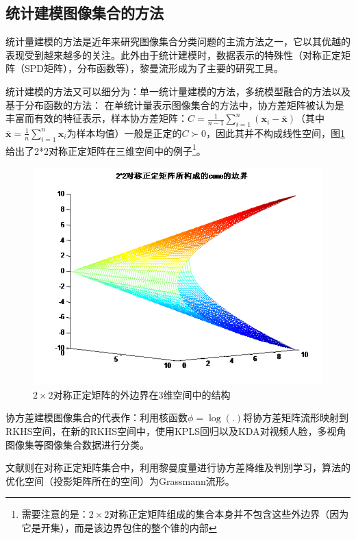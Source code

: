 \subsection{统计建模图像集合的方法}
\label{sec:current_Statistics}
统计量建模的方法是近年来研究图像集合分类问题的主流方法之一，它以其优越的表现受到越来越多的关注。此外由于统计建模时，数据表示的特殊性（对称正定矩阵（SPD矩阵），分布函数等），黎曼流形成为了主要的研究工具。

统计建模的方法又可以细分为：单一统计量建模的方法，多统模型融合的方法以及基于分布函数的方法：
在单统计量表示图像集合的方法中，协方差矩阵被认为是丰富而有效的特征表示，样本协方差矩阵：$C=\frac{1}{n-1}\sum_{i=1}^n (\bm{x}_i-\bar{\bm{x}})$（其中$\bar{\bm{x}}=\frac{1}{n}\sum_{i=1}^n \bm{x}_i$为样本均值）一般是正定的$C \succ 0$，因此其并不构成线性空间，图\ref{fig:2d_SPD_cone}给出了2*2对称正定矩阵在三维空间中的例子\footnote{需要注意的是：$2\times 2$对称正定矩阵组成的集合本身并不包含这些外边界（因为它是开集），而是该边界包住的整个锥的内部}。
\begin{figure}[h]
	\centering
	\includegraphics[width=0.5\linewidth]{source/2d_SPD_cone.png}
	\caption{$2\times 2$对称正定矩阵的外边界在3维空间中的结构}
	\label{fig:2d_SPD_cone}
\end{figure}

协方差建模图像集合的代表作\cite{Statistics_CDL}：利用核函数$\phi=\log(.)$将协方差矩阵流形映射到RKHS空间，在新的RKHS空间中，使用KPLS\cite{Kernel_KPLS}回归以及KDA\cite{Kernel_KDA}对视频人脸，多视角图像集等图像集合数据进行分类。

文献\cite{Statistics_SPDML}则在对称正定矩阵集合中，利用黎曼度量进行协方差降维及判别学习，算法的优化空间（投影矩阵所在的空间）为Grassmann流形。

